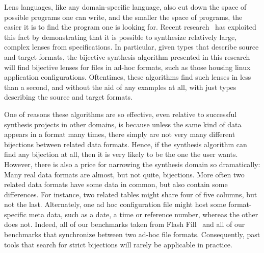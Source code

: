 \documentclass[acmsmall,screen,anonymous]{acmart}
\begin{document}
Lens languages, like any domain-specific language, also cut down the space of
possible programs one can write, and the smaller the space of programs,
the easier it is to find the program one is looking for.  
Recent research~\cite{optician, maina+:quotient-synthesis} has exploited this
fact by demonstrating that it is possible to synthesize relatively large,
complex lenses from specifications. In particular, given types that describe
source and target formats, the bijective synthesis algorithm presented in this
research will find bijective lenses
for files in ad-hoc formats, such as those housing linux application
configurations. Oftentimes, these algorithms find such lenses in less than a
second, and without the aid of any examples at all, with just types describing
the source and target formats.

One of reasons these algorithms are so effective, even relative to successful
synthesis projects in other domains, is because unless the same kind of data
appears in a format many times, there simply are not very many different
bijections between related data formats. Hence, if the synthesis algorithm can
find any bijection at all, then it is very likely to be the one the user wants.
However, there is also a price for narrowing the synthesis domain so
dramatically: Many real data formats are almost, but not quite, bijections. More
often two related data formats have some data in common, but also contain some
differences. For instance, two related tables might share four of five columns,
but not the last. Alternately, one ad hoc configuration file might host some
format-specific meta data, such as a date, a time or reference number, whereas
the other does not. Indeed, all of our benchmarks taken from Flash
Fill~\cite{flashfill} and all of our benchmarks that synchronize between two
ad-hoc file formats. Consequently, past tools that search for strict bijections
will rarely be applicable in practice.
\end{document}
